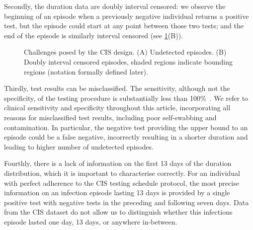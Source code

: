 \documentclass[12pt]{article}
\begin{document}

Secondly, the duration data are doubly interval censored: we observe the beginning of an episode when a previously negative individual returns a positive test, but the episode could start at any point between those two tests; and the end of the episode is similarly interval censored (see \cref{fig:challenges}(B)).

\begin{figure}
  \caption{%
    Challenges posed by the CIS design.
    (A) Undetected episodes.
    (B) Doubly interval censored episodes, shaded regions indicate bounding regions (notation formally defined later).
  }
  \label{fig:challenges}
\end{figure}


Thirdly, test results can be misclassified.
The sensitivity, although not the specificity, of the testing procedure is substantially less than 100\%~\citep{cisMethodsONS}.
We refer to clinical sensitivity and specificity throughout this article, incorporating all reasons for misclassified test results, including poor self-swabbing and contamination.
In particular, the negative test providing the upper bound to an episode could be a false negative, incorrectly resulting in a shorter duration and leading to higher number of undetected episodes.

Fourthly, there is a lack of information on the first 13 days of the duration distribution, which it is important to characterise correctly.
For an individual with perfect adherence to the CIS testing schedule protocol, the most precise information on an infection episode lasting 13 days is provided by a single positive test with negative tests in the preceding and following seven days.
Data from the CIS dataset do not allow us to distinguish whether this infections episode lasted one day, 13 days, or anywhere in-between.
\end{document}
